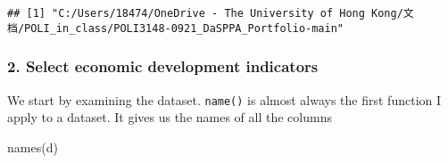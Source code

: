 \documentclass[
]{article}
\newenvironment{Shaded}{\begin{snugshade}}{\end{snugshade}}
\newcommand{\FunctionTok}[1]{\textcolor[rgb]{0.00,0.00,0.00}{#1}}
\newcommand{\NormalTok}[1]{#1}
\begin{document}
\begin{verbatim}
## [1] "C:/Users/18474/OneDrive - The University of Hong Kong/文档/POLI_in_class/POLI3148-0921_DaSPPA_Portfolio-main"
\end{verbatim}

\hypertarget{select-economic-development-indicators}{%
\subsubsection{2. Select economic development
indicators}\label{select-economic-development-indicators}}

We start by examining the dataset. \texttt{name()} is almost always the
first function I apply to a dataset. It gives us the names of all the
columns

\begin{Shaded}
\begin{Highlighting}[]
\FunctionTok{names}\NormalTok{(d)}
\end{Highlighting}
\end{Shaded}
\end{document}

